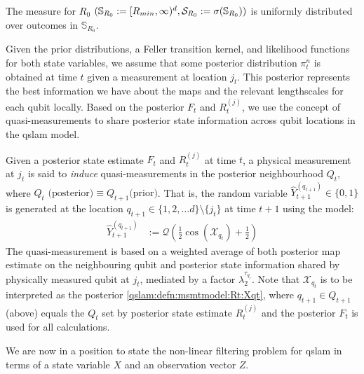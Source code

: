 \begin{defn} The measure for $R_0$  $(\mathbb{S}_{R_0}:= [R_{min}, \infty)^d, \mathcal{S}_{R_0}:= \sigma(\mathbb{S}_{R_0}))$ is uniformly distributed over outcomes in $\mathbb{S}_{R_0}$.
\end{defn} 
Given the prior distributions, a Feller transition kernel, and likelihood functions for both state variables, we assume that some posterior distribution $\pi_t^n$ is obtained  at time $t$ given a measurement at location $j_t$. This posterior represents the best information we have about the maps and the relevant lengthscales for each qubit locally. Based on the posterior  $F_t$ and $R_t^{(j)}$, we use the concept of quasi-measurements to share posterior state information across qubit locations in the qslam model.
 \begin{defn} \label{qslam:defn:quasimsmts}
 	Given a posterior state estimate $F_t$ and $R_t^{(j)}$ at time $t$, a physical measurement at $j_t$ is said to \textit{induce} quasi-measurements in the posterior neighbourhood $Q_t$, where $Q_t \text{ (posterior)} \equiv Q_{t+1} \text{(prior)}$. That is, the random variable $\hat{Y}_{t+1}^{(q_{t+1})} \in \{0,1\}$ is generated at the location $q_{t+1} \in \{1, 2, \hdots d\} \setminus \{j_t\}$ at time $t+1$ using the model:
 	\begin{align}
 	\hat{Y}_{t+1}^{(q_{t+1})}  & := \mathcal{Q}(\frac{1}{2} \cos(\mathcal{X}_{q_t}) + \frac{1}{2}) \label{qslam:defn:quasimsmts:1}
 	\end{align} The quasi-measurement is based on a weighted average of both posterior map estimate on the neighbouring qubit and posterior state information shared by physically measured qubit at $j_t$, mediated by a factor $\lambda_2^{\tau_{q_t}}$. Note that $\mathcal{X}_{q_t}$ is to be interpreted as the posterior \cref{qslam:defn:msmtmodel:Rt:Xqt}, where $ q_{t+1} \in Q_{t+1}$ (above) equals the $Q_t$ set by posterior state estimate $R_t^{(j)}$ and the posterior $F_t$ is used for all calculations. 
 \end{defn}

We are now in a position to state the non-linear filtering problem for qslam in terms of a state variable $X$ and an observation vector $Z$. 

